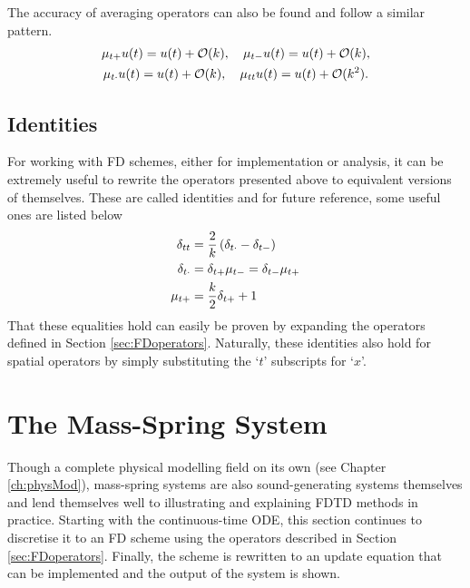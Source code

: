 The accuracy of averaging operators can also be found and follow a similar pattern. 
\begin{equation}
    \begin{gathered}
    \mu_{t+} u(t) = u(t) + \mathcal{O}(k),\quad \mu_{t-} u(t)= u(t) + \mathcal{O}(k),\\
    \mu_{t\cdot} u(t)= u(t) + \mathcal{O}(k), \quad \mu_{tt} u(t)= u(t) + \mathcal{O}(k^2).
    \end{gathered}
\end{equation}

\subsection{Identities}
For working with FD schemes, either for implementation or analysis, it can be extremely useful to rewrite the operators presented above to equivalent versions of themselves. These are called identities and for future reference, some useful ones are listed below
\begin{subequations}
    \begin{align}
        \delta_{tt} &= \frac{2}{k}\left(\delta_{t\cdot}- \delta_{t-}\right)\label{eq:identity1}\\
        \delta_{t\cdot} &= \delta_{t+}\mu_{t-} = \delta_{t-}\mu_{t+}\label{eq:identity2}\\
        \mu_{t+} &= \frac{k}{2}\delta_{t+} + 1\label{eq:identity3}
    \end{align}
\end{subequations}
That these equalities hold can easily be proven by expanding the operators defined in Section \ref{sec:FDoperators}. Naturally, these identities also hold for spatial operators by simply substituting the `$t$' subscripts for `$x$'. 

\section{%
The Mass-Spring System}\label{sec:massSpringSystem}
Though a complete physical modelling field on its own (see Chapter \ref{ch:physMod}), mass-spring systems are also sound-generating systems themselves and lend themselves well to illustrating and explaining FDTD methods in practice. Starting with the continuous-time ODE, this section continues to discretise it to an FD scheme using the operators described in Section \ref{sec:FDoperators}. Finally, the scheme is rewritten to an update equation that can be implemented and the output of the system is shown. 

